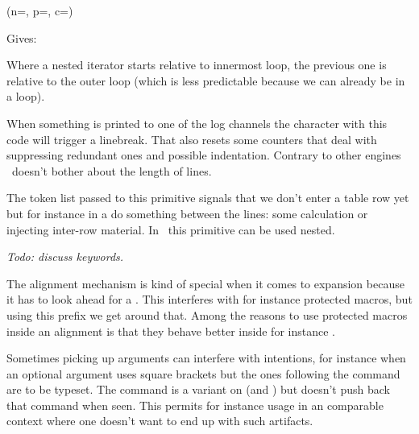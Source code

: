 \startbuffer
{} {%
     {%
        (n=\the{},
         p=\the{},
         c=\the\currentloopiterator)
    }%
}%
\stopbuffer

\typebuffer

Gives:

\getbuffer

Where a nested iterator starts relative to innermost loop, the previous one is
relative to the outer loop (which is less predictable because we can already be
in a loop).

\stopnewprimitive

\startoldprimitive[title={\prm {newlinechar}}]

When something is printed to one of the log channels the character with this code
will trigger a linebreak. That also resets some counters that deal with
suppressing redundant ones and possible indentation. Contrary to other engines
\LUAMETATEX\ doesn't bother about the length of lines.

\stopoldprimitive

\startoldprimitive[title={\prm {noalign}}]

The token list passed to this primitive signals that we don't enter a table row
yet but for instance in a  do something between the lines: some
calculation or injecting inter-row material. In \LUAMETATEX\ this primitive can
be used nested.

{\em Todo: discuss keywords.}

\stopoldprimitive

\startnewprimitive[title={\prm {noaligned}}]

The alignment mechanism is kind of special when it comes to expansion because it
has to look ahead for a . This interferes with for instance
protected macros, but using this prefix we get around that. Among the reasons to
use protected macros inside an alignment is that they behave better inside for
instance .

\stopnewprimitive

\startnewprimitive[title={\prm {noarguments}}]

Sometimes picking up arguments can interfere with intentions, for instance when
an optional argument uses square brackets but the ones following the command are
to be typeset. The  command is a variant on  (and
) but doesn't push back that command when seen. This permits for
instance usage in an  comparable context where one doesn't want to end
up with such artifacts.


